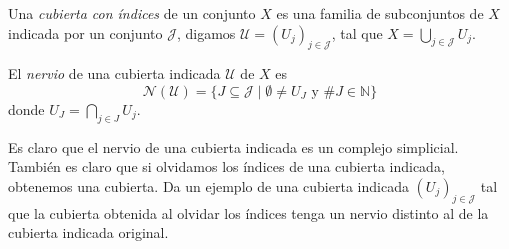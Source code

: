 \documentclass{standalone}
\begin{document}
	\begin{definition}\label{def:index_cover}
		Una \emph{cubierta con índices} de un conjunto $X$ es una familia de subconjuntos de $X$ indicada por un conjunto $\mathcal{J}$, digamos $\mathcal{U}=(U_{j})_{j\in \mathcal{J}}$, tal que $X=\bigcup_{j\in \mathcal{J}}U_{j}$.
	\end{definition}
	
	\begin{definition}\label{def:indexed_nerve}
		El \emph{nervio} de una cubierta indicada $\mathcal{U}$ de $X$ es 
		\[
		\mathcal{N}(\mathcal{U})=\{J\subseteq \mathcal{J}\mid \emptyset\neq U_{J}\text{ y }\#J\in\mathbb{N}\}
		\]donde $U_{J}=\bigcap_{j\in J}U_{j}$.
	\end{definition}
	
	\begin{exercise}
		Es claro que el nervio de una cubierta indicada es un complejo simplicial. También es claro que si olvidamos los índices de una cubierta indicada, obtenemos una cubierta. Da un ejemplo de una cubierta indicada $(U_{j})_{j\in \mathcal{J}}$ tal que la cubierta obtenida al olvidar los índices tenga un nervio distinto al de la cubierta indicada original.
	\end{exercise}
\end{document}
